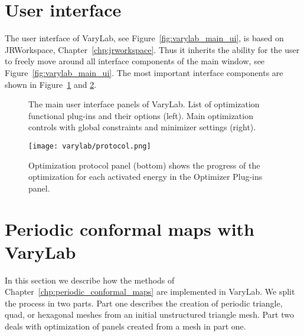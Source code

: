 \documentclass[Thesis.tex]{subfiles}
\begin{document}
\section{User interface}
\label{sec:ui_varylab}

The user interface of {\sc VaryLab}, see Figure~\ref{fig:varylab_main_ui}, is based on {\sc JRWorkspace}, Chapter~\ref{chp:jrworkspace}. Thus it inherits the ability for the user to freely move around all interface components of the main window, see Figure~\ref{fig:varylab_main_ui}. 
The most important interface components are shown in Figure~\ref{fig:optimization_interface_varylab} and \ref{fig:protocol_interface_varylab}.

\begin{figure}
\begin{center}
\caption{The main user interface panels of {\sc VaryLab}. List of optimization functional plug-ins and their options (left). Main optimization controls with global constraints and minimizer settings (right).}
\label{fig:optimization_interface_varylab}
\end{center}
\end{figure}

\begin{figure}
\begin{center}
\texttt{[image: varylab/protocol.png]}
\caption{Optimization protocol panel (bottom) shows the progress of the optimization for each activated energy in the Optimizer Plug-ins panel.}
\label{fig:protocol_interface_varylab}
\end{center}
\end{figure}


\section{Periodic conformal maps with {\sc VaryLab}}
\label{sec:periodic_varylab}
In this section we describe how the methods of Chapter~\ref{chp:periodic_conformal_maps} are implemented in {\sc VaryLab}. We split the process in two parts. Part one describes the creation of periodic triangle, quad, or hexagonal meshes from an initial unstructured triangle mesh. Part two deals with optimization of panels created from a mesh in part one.
\end{document}
